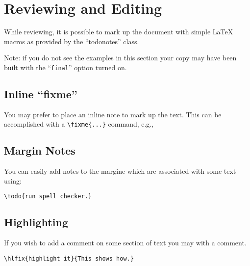 \chapter{Reviewing and Editing}
\label{ch:review}


While reviewing, it is possible to mark up the document with simple
\LaTeX{} macros as provided by the ``todonotes'' class.

Note: if you do not see the examples in this section your copy may
have been built with the ``\texttt{final}'' option turned on.

\section{Inline ``fixme''}

You may prefer to place an inline note to mark up the text.
This can be accomplished with a  \verb|\fixme{...}| command, e.g.,


\section{Margin Notes}

You can easily add notes to the  margine  which
are associated with some text using:

\begin{verbatim}
\todo{run spell checker.}
\end{verbatim}


\section{Highlighting}

If you wish to add a comment on some section of text you may
 with a comment.


\begin{verbatim}
\hlfix{highlight it}{This shows how.}
\end{verbatim}


